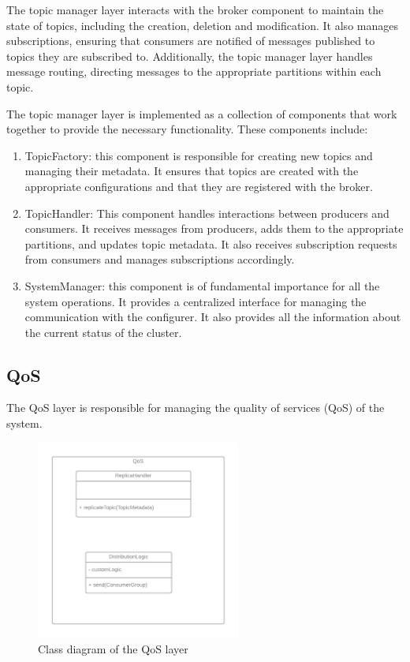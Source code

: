 The topic manager layer interacts with the broker component to maintain the
state of topics, including the creation, deletion and modification.
It also manages subscriptions, ensuring that consumers are notified of messages
published to topics they are subscribed to. Additionally, the topic manager
layer handles message routing, directing messages to the appropriate partitions
within each topic.

The topic manager layer is implemented as a collection of components that work
together to provide the necessary functionality. These components include:

\begin{enumerate}
    \item   TopicFactory: this component is responsible for creating new
            topics and managing their metadata. It ensures that topics are
            created with the appropriate configurations and that they are
            registered with the broker.
    \item   TopicHandler: This component handles interactions between producers
            and consumers. It receives messages from producers, adds them to
            the appropriate partitions, and updates topic metadata. It also
            receives subscription requests from consumers and manages
            subscriptions accordingly.
    \item   SystemManager: this component is of fundamental importance for all
            the system operations. It provides a centralized interface for
            managing the communication with the configurer. It also provides
            all the information about the current status of the cluster.
\end{enumerate}

\subsection{QoS}

The QoS layer is responsible for managing the quality of services (QoS) of the
system.

\begin{figure}[H]
    \centering
    \includegraphics[width=0.6\textwidth]{Figures/class_diagram_QoS.png}
    \caption{Class diagram of the QoS layer}
\end{figure}

